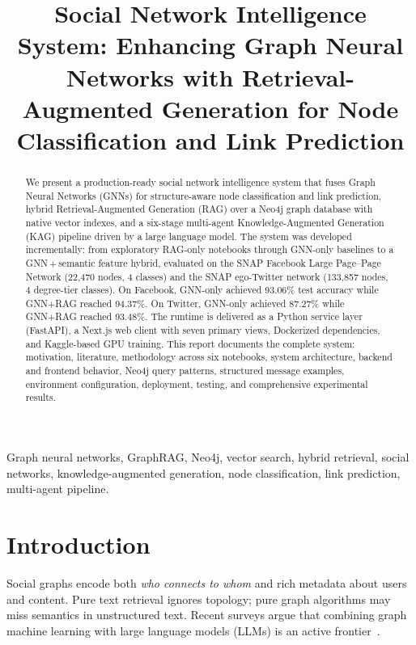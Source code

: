 \documentclass[conference]{IEEEtran}
\title{Social Network Intelligence System: Enhancing Graph Neural Networks with Retrieval-Augmented Generation for Node Classification and Link Prediction}
\author{%
\IEEEauthorblockN{Akshat Sharma\textsuperscript{*}}%
\IEEEauthorblockA{\textit{Department of Computer Science}\\
\textit{Shiv Nadar University}\\
Greater Noida, India\\
}%
}
\begin{document}
\maketitle

\begin{abstract}
We present a production-ready social network intelligence system that fuses Graph Neural Networks (GNNs) for structure-aware node classification and link prediction, hybrid Retrieval-Augmented Generation (RAG) over a Neo4j graph database with native vector indexes, and a six-stage multi-agent Knowledge-Augmented Generation (KAG) pipeline driven by a large language model. The system was developed incrementally: from exploratory RAG-only notebooks through GNN-only baselines to a GNN\,+\,semantic feature hybrid, evaluated on the SNAP Facebook Large Page--Page Network (22{,}470 nodes, 4 classes) and the SNAP ego-Twitter network (133{,}857 nodes, 4 degree-tier classes). On Facebook, GNN-only achieved 93.06\% test accuracy while GNN+RAG reached 94.37\%. On Twitter, GNN-only achieved 87.27\% while GNN+RAG reached 93.48\%. The runtime is delivered as a Python service layer (FastAPI), a Next.js web client with seven primary views, Dockerized dependencies, and Kaggle-based GPU training. This report documents the complete system: motivation, literature, methodology across six notebooks, system architecture, backend and frontend behavior, Neo4j query patterns, structured message examples, environment configuration, deployment, testing, and comprehensive experimental results.
\end{abstract}

\begin{IEEEkeywords}
Graph neural networks, GraphRAG, Neo4j, vector search, hybrid retrieval, social networks, knowledge-augmented generation, node classification, link prediction, multi-agent pipeline.
\end{IEEEkeywords}

\section{Introduction}

Social graphs encode both \emph{who connects to whom} and rich metadata about users and content. Pure text retrieval ignores topology; pure graph algorithms may miss semantics in unstructured text. Recent surveys argue that combining graph machine learning with large language models (LLMs) is an active frontier~\cite{acm_survey_gml_llm}.
\end{document}
